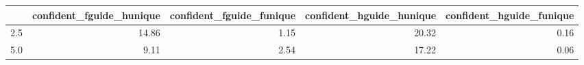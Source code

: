 \begin{tabular}{lrrrr}
\toprule
 & confident_fguide_hunique & confident_fguide_funique & confident_hguide_hunique & confident_hguide_funique \\
\midrule
2.5 & 14.86 & 1.15 & 20.32 & 0.16 \\
5.0 & 9.11 & 2.54 & 17.22 & 0.06 \\
\bottomrule
\end{tabular}
